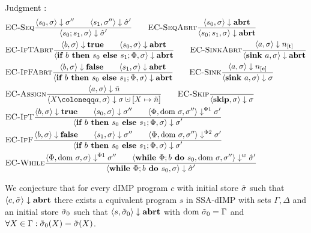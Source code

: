 \\
Judgment :
\begin{align*}
    &\bsrule{EC-Seq}{\bigstep{s_0}{\sigma}{\store''} \qquad \bigstep{s_1}{\store''}{\excstore'}}
    {\bigstep{\defaultssaseq}{\store}{\excstore'}}\qquad
    \bsrule{EC-SeqAbrt}{\bigstep{s_0}{\sigma}{\exception}}
    {\bigstep{\defaultssaseq}{\store}{\exception}} \\
    &\bsrule{EC-IfTAbrt}{\bigstep{b}{\store}{\btrue}\qquad \bigstep{s_0}{\store}{\exception}}
    {\bigstep{\defaultssaif}{\store}{\exception}} \qquad
    \bsrule{EC-SinkAbrt}{\bigstep{a}{\store}{\tracked{}}}
    {\bigstep{\defaultsink}{\store}{\exception}}\\
    &\bsrule{EC-IfFAbrt}{\bigstep{b}{\store}{\bfalse}\qquad \bigstep{s_1}{\store}{\exception}}
    {\bigstep{\defaultssaif}{\store}{\exception}} \qquad
    \bsrule{EC-Sink}{\bigstep{a}{\store}{\clean{}}}
    {\bigstep{\defaultsink}{\store}{\store}}\\
    &\bsrule{EC-Assign}{\bigstep{a}{\store}{\flaggedn{}}}
    {\bigstep{\defaultstore}{\store}{\storeassign{\store}{X \mapsto \flaggedn{}}}} \qquad
    \bsrule{EC-Skip}{}{\bigstep{\skipcmd}{\store}{\store}}\\
    &\bsrule{EC-IfT}{\bigstep{b}{\store}{\btrue}\qquad \bigstep{s_0}{\store}{\store''}
    \qquad \bigsteppl{\philist}{\dom\store}{\store''}{\store'}}
    {\bigstep{\defaultssaif}{\store}{\store'}}\\
    &\bsrule{EC-IfF}{\bigstep{b}{\store}{\bfalse}\qquad \bigstep{s_1}{\store}{\store''}
    \qquad \bigsteppr{\philist}{\dom\store}{\store''}{\store'}}
    {\bigstep{\defaultssaif}{\store}{\store'}}\\
    &\bsrule{EC-While}{\bigsteppl{\philist}{\dom\store}{\store}{\store''} \qquad
    \bigstepw{\defaultssawhile}{\dom\store}{\store''}{\excstore'}}
    {\bigstep{\defaultssawhile}{\store}{\excstore'}}\\
\end{align*}

\begin{conjecture}
    We conjecture that for every dIMP program $c$ with initial store $\tilde{\sigma}$
    such that $\langle c, \tilde{\sigma} \rangle \downarrow \textbf{abrt}$ there exists a equivalent program
    $s$ in SSA-dIMP with sets $\Gamma, \Delta$ and an initial store $\tilde{\sigma}_0$ such that
     $\langle s, \tilde{\sigma}_0 \rangle \downarrow \textbf{abrt}$ with
    $\text{dom }{\tilde{\sigma}_0} = \Gamma$ and $\forall X \in \Gamma: \tilde{\sigma}_0(X) = \tilde{\sigma}(X)$.
\end{conjecture}


